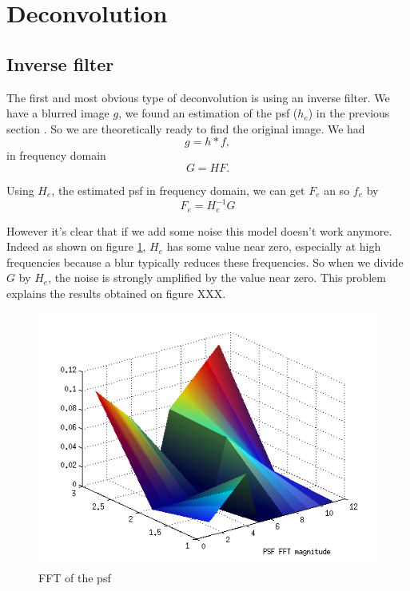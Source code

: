 \section{Deconvolution}
\subsection{Inverse filter}
The first and most obvious type of deconvolution is using an inverse filter. We have a blurred image $g$, we found an estimation of the psf ($h_e$) in the previous section %
. So we are theoretically ready to find the original image. We had
\begin{equation}
 g =  h*f,
\end{equation}
in frequency domain
\begin{equation}
G = HF. 
\end{equation}

Using $H_e$, the estimated psf in frequency domain, we can get $F_e$ an so $f_e$ by 
\begin{equation}
F_{e} = H_{e}^{-1} G
\end{equation} 

However it's clear that if we add some noise this model doesn't work anymore. Indeed as shown on figure \ref{fig:psfFFT}, $H_e$ has some value near zero, especially at high frequencies because a blur typically reduces these frequencies. So when we divide $G$ by $H_e$, the noise is strongly amplified by the value near zero. This problem explains the results obtained on figure XXX. %

\begin{figure}
\centering
\includegraphics[scale=0.5]{../Images/psfFFT.png}
\caption{FFT of the psf}
\label{fig:psfFFT}
\end{figure}


